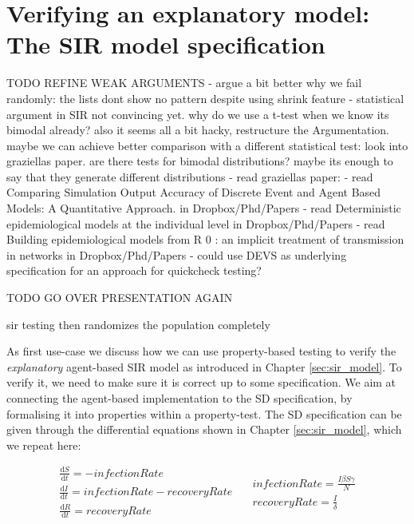 \chapter{Verifying an explanatory model: \\ The SIR model specification}
\label{ch:prop_explanatory}

TODO REFINE WEAK ARGUMENTS
- argue a bit better why we fail randomly: the lists dont show no pattern despite using shrink feature
- statistical argument in SIR not convincing yet. why do we use a t-test when we know its bimodal already? also it seems all a bit hacky, restructure the Argumentation. maybe we can achieve better comparison with a different statistical test: look into graziellas paper. are there tests for bimodal distributions? maybe its enough to say that they generate different distributions
- read graziellas paper: \cite{figueredo_comparing_2014}
- read Comparing Simulation Output Accuracy of Discrete Event and Agent Based Models: A Quantitative Approach. in Dropbox/Phd/Papers
- read Deterministic epidemiological models at the individual level in Dropbox/Phd/Papers
- read Building epidemiological models from R 0 : an implicit treatment of transmission in networks in Dropbox/Phd/Papers
- could use DEVS as underlying specification for an approach for quickcheck testing?

TODO GO OVER PRESENTATION AGAIN

sir testing then randomizes the population completely

As first use-case we discuss how we can use property-based testing to verify the \textit{explanatory} agent-based SIR model as introduced in Chapter \ref{sec:sir_model}. To verify it, we need to make sure it is correct up to some specification. We aim at connecting the agent-based implementation to the SD specification, by formalising it into properties within a property-test. The SD specification can be given through the differential equations shown in Chapter \ref{sec:sir_model}, which we repeat here:

\begin{equation}
\begin{split}
\frac{\mathrm d S}{\mathrm d t} = -infectionRate \\
\frac{\mathrm d I}{\mathrm d t} = infectionRate - recoveryRate \\
\frac{\mathrm d R}{\mathrm d t} = recoveryRate 
\end{split}
\quad
\begin{split}
infectionRate = \frac{I \beta S \gamma}{N} \\
recoveryRate = \frac{I}{\delta} 
\end{split}
\end{equation}
\label{eq:sir_delta_rates}

